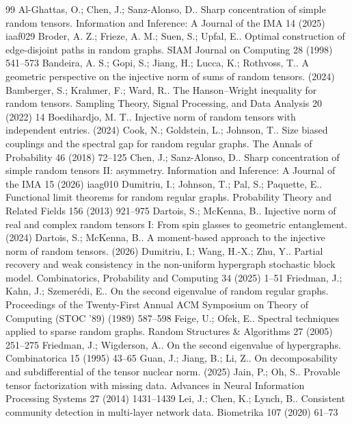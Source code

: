 \documentclass[10pt,a4paper]{amsart}
\numberwithin{equation}{section}
\begin{document}
\begin{thebibliography}{99}
 Al-Ghattas, O.; Chen, J.; Sanz-Alonso, D.. Sharp concentration of simple random tensors. Information and Inference: A Journal of the IMA 14 (2025) iaaf029
 Broder, A. Z.; Frieze, A. M.; Suen, S.; Upfal, E.. Optimal construction of edge-disjoint paths in random graphs. SIAM Journal on Computing 28 (1998) 541--573
 Bandeira, A. S.; Gopi, S.; Jiang, H.; Lucca, K.; Rothvoss, T.. A geometric perspective on the injective norm of sums of random tensors. (2024)
 Bamberger, S.; Krahmer, F.; Ward, R.. The Hanson--Wright inequality for random tensors. Sampling Theory, Signal Processing, and Data Analysis 20 (2022) 14
 Boedihardjo, M. T.. Injective norm of random tensors with independent entries. (2024)
 Cook, N.; Goldstein, L.; Johnson, T.. Size biased couplings and the spectral gap for random regular graphs. The Annals of Probability 46 (2018) 72--125
 Chen, J.; Sanz-Alonso, D.. Sharp concentration of simple random tensors II: asymmetry. Information and Inference: A Journal of the IMA 15 (2026) iaag010
 Dumitriu, I.; Johnson, T.; Pal, S.; Paquette, E.. Functional limit theorems for random regular graphs. Probability Theory and Related Fields 156 (2013) 921--975
 Dartois, S.; McKenna, B.. Injective norm of real and complex random tensors I: From spin glasses to geometric entanglement. (2024)
 Dartois, S.; McKenna, B.. A moment-based approach to the injective norm of random tensors. (2026)
 Dumitriu, I.; Wang, H.-X.; Zhu, Y.. Partial recovery and weak consistency in the non-uniform hypergraph stochastic block model. Combinatorics, Probability and Computing 34 (2025) 1--51
 Friedman, J.; Kahn, J.; Szemer{\'e}di, E.. On the second eigenvalue of random regular graphs. Proceedings of the Twenty-First Annual ACM Symposium on Theory of Computing (STOC '89) (1989) 587--598
 Feige, U.; Ofek, E.. Spectral techniques applied to sparse random graphs. Random Structures \& Algorithms 27 (2005) 251--275
 Friedman, J.; Wigderson, A.. On the second eigenvalue of hypergraphs. Combinatorica 15 (1995) 43--65
 Guan, J.; Jiang, B.; Li, Z.. On decomposability and subdifferential of the tensor nuclear norm. (2025)
 Jain, P.; Oh, S.. Provable tensor factorization with missing data. Advances in Neural Information Processing Systems 27 (2014) 1431--1439
 Lei, J.; Chen, K.; Lynch, B.. Consistent community detection in multi-layer network data. Biometrika 107 (2020) 61--73

\end{thebibliography}
\end{document}
